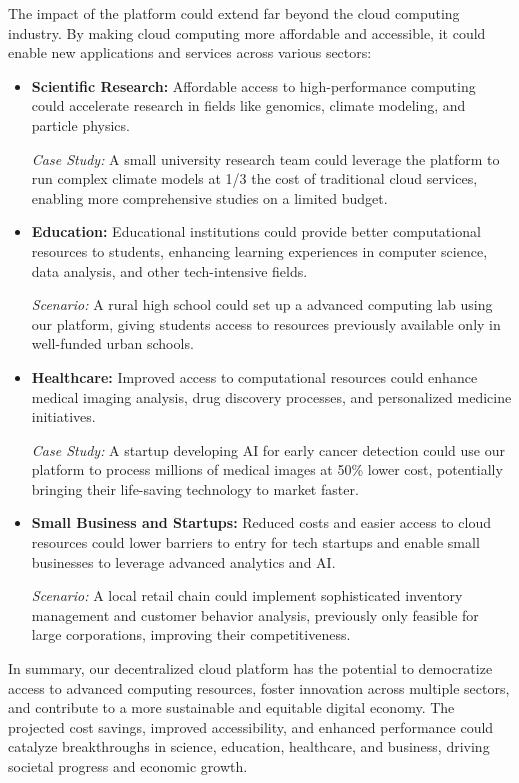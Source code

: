 The impact of the platform could extend far beyond the cloud computing industry. By making cloud computing more affordable and accessible, it could enable new applications and services across various sectors:

\begin{itemize}
    \item \textbf{Scientific Research:} Affordable access to high-performance computing could accelerate research in fields like genomics, climate modeling, and particle physics.

    \textit{Case Study:} A small university research team could leverage the platform to run complex climate models at 1/3 the cost of traditional cloud services, enabling more comprehensive studies on a limited budget.

    \item \textbf{Education:} Educational institutions could provide better computational resources to students, enhancing learning experiences in computer science, data analysis, and other tech-intensive fields.

    \textit{Scenario:} A rural high school could set up a advanced computing lab using our platform, giving students access to resources previously available only in well-funded urban schools.

    \item \textbf{Healthcare:} Improved access to computational resources could enhance medical imaging analysis, drug discovery processes, and personalized medicine initiatives.

    \textit{Case Study:} A startup developing AI for early cancer detection could use our platform to process millions of medical images at 50\% lower cost, potentially bringing their life-saving technology to market faster.

    \item \textbf{Small Business and Startups:} Reduced costs and easier access to cloud resources could lower barriers to entry for tech startups and enable small businesses to leverage advanced analytics and AI.

    \textit{Scenario:} A local retail chain could implement sophisticated inventory management and customer behavior analysis, previously only feasible for large corporations, improving their competitiveness.
\end{itemize}

In summary, our decentralized cloud platform has the potential to democratize access to advanced computing resources, foster innovation across multiple sectors, and contribute to a more sustainable and equitable digital economy. The projected cost savings, improved accessibility, and enhanced performance could catalyze breakthroughs in science, education, healthcare, and business, driving societal progress and economic growth.
